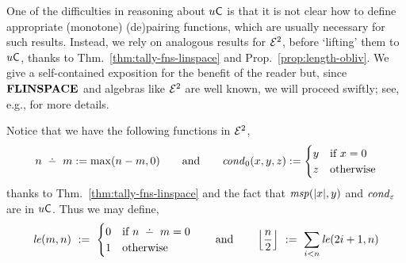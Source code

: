 \documentclass{lmcs}
\begin{document}
One of the difficulties in reasoning about $u \mathsf{C}$ is that it is not clear how to define appropriate (monotone) (de)pairing functions, which are usually necessary for such results.
%
Instead, we rely on analogous results for $\mathcal{E}^2$, before `lifting' them to $u \mathsf{C}$, thanks to Thm.~\ref{thm:tally-fns-linspace} and Prop.~\ref{prop:length-obliv}.
We give a self-contained exposition for the benefit of the reader but, since $\mathbf{FLINSPACE}$ and algebras like $\mathcal{E}^2$ are well known, we will proceed swiftly; see, e.g., \cite{CloKra02} for more details.


Notice that we have the following functions in $\mathcal{E}^2$,
\[
n \subtr m  \dfn  \max (n-m , 0) 
\qquad \text{and} \qquad 
\cond_0 (x,y,z) \dfn \begin{cases}
y & \text{if $x = 0$} \\
z & \text{otherwise}
\end{cases}
\]
thanks to Thm.~\ref{thm:tally-fns-linspace} and the fact that $\mathit{msp} (|x|, y)$ and $\mathit{cond}_\varepsilon$ are in $u \mathsf{C}$.
Thus
we may define,
\[
\Le (m,n) \ \dfn \ \begin{cases}
0 & \text{if $n \subtr m = 0$}\\
1 & \text{otherwise}
\end{cases}
\qquad\text{and}\qquad
\hlf{n}
\ \dfn\  
\sum\limits_{i<n} \Le ({{2i+1}} , n )
\]
\end{document}
